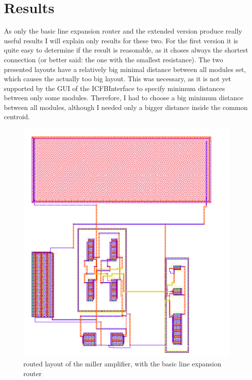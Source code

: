 \chapter{Results}
As only the basic line expansion router and the extended version produce really useful results I will explain only results for these two. For the first version  it is quite easy to determine if the result is reasonable, as it choses always the shortest connection (or better said: the one with the smallest resistance). The two presented layouts have a relatively big minimal distance between all modules set, which causes the actually too big layout. This was necessary, as it is not yet supported by the GUI of the ICFBInterface to specify minimum distances between only some modules. Therefore, I had to choose a big minimum distance between all modules, although I needed only a bigger distance inside the common centroid.

\begin{figure}
	\centering
	\includegraphics[scale=.6]{FIG/miller_amplifier_routed_basic_line_expansion.png}
  	\caption{routed layout of the miller amplifier, with the basic line expansion router}
	\label{fig:miller_amplifier_routed_basic_line_expansion}
\end{figure}

